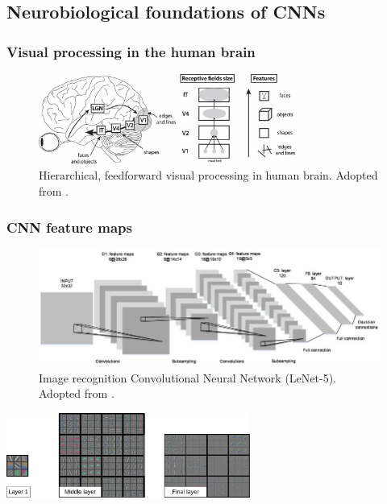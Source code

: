 \documentclass[a4paper,9pt]{beamer}
\theoremstyle{mytheoremstyle}
\begin{document}
\subsection{Neurobiological foundations of CNNs}

\begin{frame}
\frametitle{Visual processing in the human brain}
\begin{figure}
\begin{center}
  \includegraphics[width=0.75\textwidth]{res/human_vision.png}
\end{center}
	\caption{Hierarchical, feedforward visual processing in human brain. Adopted from \parencite{manassi2013}.}
\end{figure}
\end{frame}

\begin{frame}
\frametitle{CNN feature maps}
\begin{figure}
\begin{center}
  \includegraphics[width=\textwidth]{res/lenet.png}
\end{center}
	\caption{Image recognition Convolutional Neural Network (LeNet-5). Adopted from \parencite{lecun1989}.}
\end{figure}
\begin{center}
\includegraphics[width=0.6\textwidth]{res/filter_vis.png}
\end{center}
\end{frame}
\end{document}
